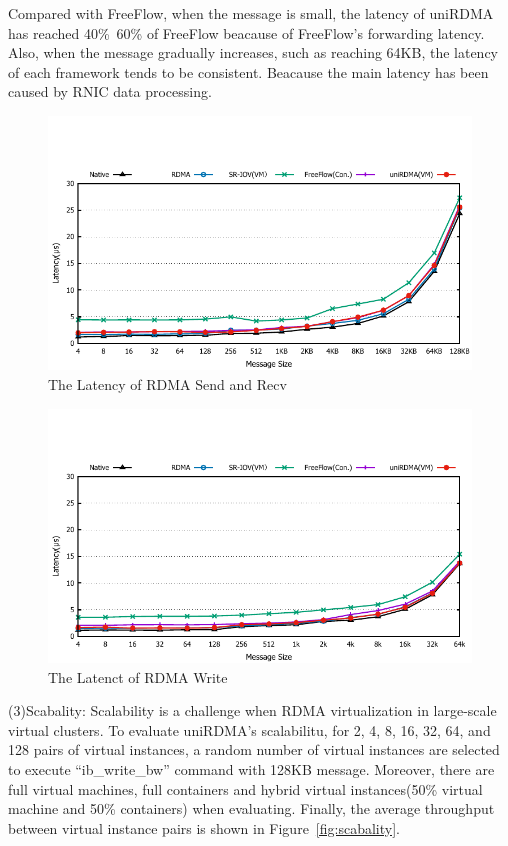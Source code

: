 Compared with FreeFlow, when the message is small, the latency of uniRDMA has reached 40\%~60\%  of FreeFlow beacause of FreeFlow's forwarding latency. Also, when the message gradually increases, such as reaching 64KB, the latency of each framework tends to be consistent. Beacause the main latency has been caused by RNIC data processing.

\begin{figure}[!ht]
	\centering
	\includegraphics[width=1.0\linewidth]{images/send-lat.pdf}
	\caption{The Latency of RDMA Send and Recv}
	\label{fig:send-lat}
\end{figure}

\begin{figure}[!ht]
	\centering
	\includegraphics[width=1.0\linewidth]{images/write-lat.pdf}
	\caption{The Latenct of RDMA Write}
	\label{fig:write-lat}
\end{figure}
(3)Scabality: 
Scalability is a challenge when RDMA virtualization in large-scale virtual clusters. To evaluate uniRDMA's scalabilitu, for 2, 4, 8, 16, 32, 64, and 128 pairs of virtual instances, a random number of virtual instances are selected to execute ``ib\_write\_bw'' command with 128KB message. Moreover, there are full virtual machines, full containers and hybrid virtual instances(50\% virtual machine and 50\% containers) when evaluating. Finally, the average throughput between virtual instance pairs is shown in Figure~\ref{fig:scabality}.

